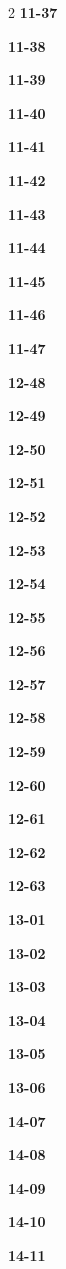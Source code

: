 \documentclass[10pt,a4paper]{article}
\begin{document}
\begin{multicols}{2}
\noindent\textbf{11-37}\ \par
\noindent\textbf{11-38}\ \par
\noindent\textbf{11-39}\ \par
\noindent\textbf{11-40}\ \par
\noindent\textbf{11-41}\ \par
\noindent\textbf{11-42}\ \par
\noindent\textbf{11-43}\ \par
\noindent\textbf{11-44}\ \par
\noindent\textbf{11-45}\ \par
\noindent\textbf{11-46}\ \par
\noindent\textbf{11-47}\ \par
\noindent\textbf{12-48}\ \par
\noindent\textbf{12-49}\ \par
\noindent\textbf{12-50}\ \par
\noindent\textbf{12-51}\ \par
\noindent\textbf{12-52}\ \par
\noindent\textbf{12-53}\ \par
\noindent\textbf{12-54}\ \par
\noindent\textbf{12-55}\ \par
\noindent\textbf{12-56}\ \par
\noindent\textbf{12-57}\ \par
\noindent\textbf{12-58}\ \par
\noindent\textbf{12-59}\ \par
\noindent\textbf{12-60}\ \par
\noindent\textbf{12-61}\ \par
\noindent\textbf{12-62}\ \par
\noindent\textbf{12-63}\ \par
\noindent\textbf{13-01}\ \par
\noindent\textbf{13-02}\ \par
\noindent\textbf{13-03}\ \par
\noindent\textbf{13-04}\ \par
\noindent\textbf{13-05}\ \par
\noindent\textbf{13-06}\ \par
\noindent\textbf{14-07}\ \par
\noindent\textbf{14-08}\ \par
\noindent\textbf{14-09}\ \par
\noindent\textbf{14-10}\ \par
\noindent\textbf{14-11}\ \par

\end{multicols}
\end{document}
